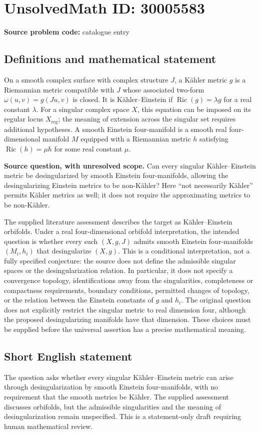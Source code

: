 \documentclass[11pt]{article}
\begin{document}
\section*{UnsolvedMath ID: 30005583}
\textbf{Source problem code:} catalogue entry
\subsection{Definitions and mathematical statement}
On a smooth complex surface with complex structure \(J\), a Kähler metric \(g\) is a Riemannian metric compatible with \(J\) whose associated two-form \(\omega(u,v)=g(Ju,v)\) is closed. It is Kähler--Einstein if \(\operatorname{Ric}(g)=\lambda g\) for a real constant \(\lambda\). For a singular complex space \(X\), this equation can be imposed on its regular locus \(X_{\mathrm{reg}}\); the meaning of extension across the singular set requires additional hypotheses. A smooth Einstein four-manifold is a smooth real four-dimensional manifold \(M\) equipped with a Riemannian metric \(h\) satisfying \(\operatorname{Ric}(h)=\mu h\) for some real constant \(\mu\).

\textbf{Source question, with unresolved scope.} Can every singular Kähler--Einstein metric be desingularized by smooth Einstein four-manifolds, allowing the desingularizing Einstein metrics to be non-Kähler? Here ``not necessarily Kähler'' permits Kähler metrics as well; it does not require the approximating metrics to be non-Kähler.

The supplied literature assessment describes the target as Kähler--Einstein orbifolds. Under a real four-dimensional orbifold interpretation, the intended question is whether every such \((X,g,J)\) admits smooth Einstein four-manifolds \((M_i,h_i)\) that desingularize \((X,g)\). This is a conditional interpretation, not a fully specified conjecture: the source does not define the admissible singular spaces or the desingularization relation. In particular, it does not specify a convergence topology, identifications away from the singularities, completeness or compactness requirements, boundary conditions, permitted changes of topology, or the relation between the Einstein constants of \(g\) and \(h_i\). The original question does not explicitly restrict the singular metric to real dimension four, although the proposed desingularizing manifolds have that dimension. These choices must be supplied before the universal assertion has a precise mathematical meaning.
\subsection{Short English statement}
The question asks whether every singular Kähler--Einstein metric can arise through desingularization by smooth Einstein four-manifolds, with no requirement that the smooth metrics be Kähler. The supplied assessment discusses orbifolds, but the admissible singularities and the meaning of desingularization remain unspecified. This is a statement-only draft requiring human mathematical review.
\end{document}
